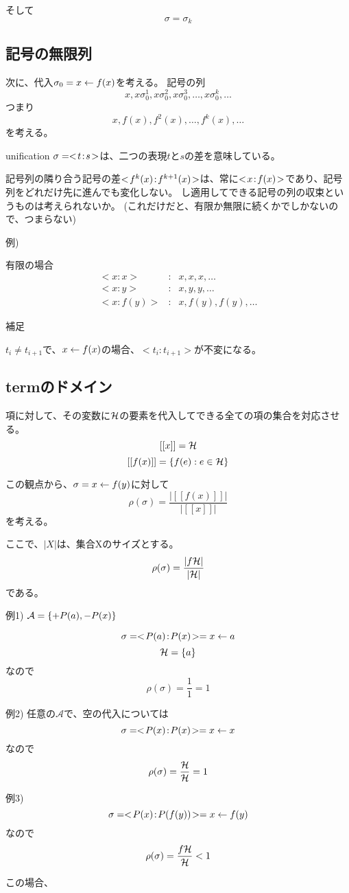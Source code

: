 \documentclass[10pt, oneside]{jarticle}   	%
\begin{document}
そして $$\sigma = \sigma_k$$


\subsection{記号の無限列}
次に、代入$\sigma_0=x \leftarrow f(x)$を考える。
記号の列
$$x, x \sigma_0^1, x \sigma_0^2, x \sigma_0^3,\dots,x \sigma_0^k, \dots$$
つまり
$$x, f(x), f^2(x), \dots , f^k(x), \dots $$
を考える。

unification $\sigma=<\!t\!:\!s\!>$は、二つの表現$t$と$s$の差を意味している。

記号列の隣り合う記号の差$<\!f^k(x)\!:\!f^{k+1}(x)\!>$は、常に$<\!x\!:\!f(x)\!>$であり、記号列をどれだけ先に進んでも変化しない。
し適用してできる記号の列の収束というものは考えられないか。
(これだけだと、有限か無限に続くかでしかないので、つまらない)

例)

有限の場合
\begin{eqnarray}
<x:x>  &:& x,x,x,\dots \\
<x:y>  &:& x,y,y,\dots \\
<x:f(y)> &:& x,f(y),f(y),\dots
\end{eqnarray}

補足

$t_i\neq t_{i+1}$で、$x \leftarrow f(x)$の場合、$<t_i:t_{i+1}>$が不変になる。

\subsection{termのドメイン}

項に対して、その変数に$\mathcal{H}$の要素を代入してできる全ての項の集合を対応させる。
$$[[x]] = \mathcal{H}$$
$$[[f(x)]] = \{{f(e) : e \in \mathcal{H}}\}$$

この観点から、$\sigma=x \leftarrow f(y)$に対して$$\rho(\sigma)=\frac{|[[f(x)]]|}{|[[x]]|}$$を考える。

ここで、$|X|$は、集合Xのサイズとする。
$$\rho(\sigma)=\frac{|f\mathcal{H}|}{|\mathcal{H}|}$$
である。

例1)
$\mathcal{A} = \{{+P(a),-P(x)}\}$

$$\sigma=<\!P(a)\!:\!P(x)\!> = x \leftarrow a$$
$$\mathcal{H}=\{{a}\}$$
なので
$$\rho(\sigma)=\frac{1}{1}=1$$

例2)
任意の$\mathcal{A}$で、空の代入については
$$\sigma=<\!P(x)\!:\!P(x)\!> = x \leftarrow x$$
なので
$$\rho(\sigma)=\frac{\mathcal{H}}{\mathcal{H}}=1$$

例3)
$$\sigma=<\!P(x)\!:\!P(f(y))\!> = x \leftarrow f(y)$$
なので
$$\rho(\sigma)=\frac{f\mathcal{H}}{\mathcal{H}} < 1$$

この場合、
\end{document}
